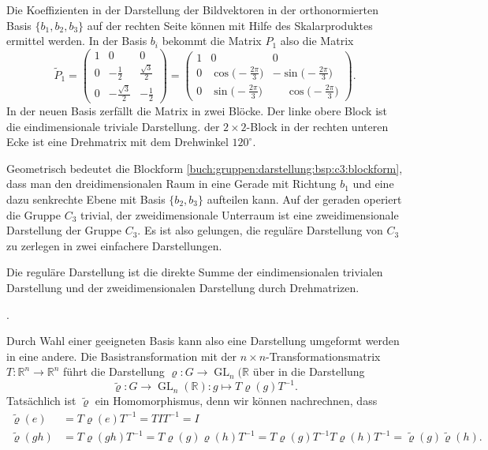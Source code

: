 \begin{beispiel}
Die Koeffizienten in der Darstellung der Bildvektoren in der
orthonormierten Basis $\{b_1,b_2,b_3\}$ auf der rechten Seite
können mit Hilfe des Skalarproduktes ermittel werden.
In der Basis $b_i$ bekommt die Matrix $P_1$ also die Matrix
\begin{equation}
\renewcommand{\arraystretch}{1.2}
\tilde{P}_1
=
\begin{pmatrix}
1&0&0\\
0&-\frac12 & \frac{\!\sqrt{3}}2\\
0&-\frac{\!\sqrt{3}}2&-\frac12
\end{pmatrix}
=
\begin{pmatrix}
1&0&0\\
0&\cos\bigl(-\frac{2\pi}{3}\bigr)& -\sin\bigl(-\frac{2\pi}{3}\bigr) \\
0&\sin\bigl(-\frac{2\pi}{3}\bigr)& \phantom{-}\cos\bigl(-\frac{2\pi}{3}\bigr)
\end{pmatrix}.
\label{buch:gruppen:darstellung:bsp:c3:blockform}
\end{equation}
In der neuen Basis zerfällt die Matrix in zwei Blöcke.
Der linke obere Block ist die eindimensionale triviale Darstellung.
der $2\times 2$-Block in der rechten unteren Ecke ist eine Drehmatrix mit
dem Drehwinkel $120^\circ$.

Geometrisch bedeutet die Blockform
\eqref{buch:gruppen:darstellung:bsp:c3:blockform}, dass man den
dreidimensionalen Raum in eine Gerade mit Richtung $b_1$ und
eine dazu senkrechte Ebene mit Basis $\{b_2,b_3\}$ aufteilen
kann.
Auf der geraden operiert die Gruppe $C_3$ trivial, der zweidimensionale
Unterraum ist eine zweidimensionale Darstellung der Gruppe $C_3$.
Es ist also gelungen, die reguläre Darstellung von $C_3$ zu zerlegen
in zwei einfachere Darstellungen.

Die reguläre Darstellung ist die direkte Summe der eindimensionalen
trivialen Darstellung und der zweidimensionalen Darstellung durch
Drehmatrizen.
\end{beispiel}.

Durch Wahl einer geeigneten Basis kann also eine Darstellung umgeformt
werden in eine andere.
Die Basistransformation mit der $n\times n$-Transformationsmatrix
$T:\mathbb{R}^n\to\mathbb{R}^n$ führt die 
Darstellung $\varrho\colon G\to\operatorname{GL}_n(\mathbb{R}$ über
in die Darstellung
\[
\tilde{\varrho}
\colon
G\to\operatorname{GL}_n(\mathbb{R})
:
g\mapsto T\varrho(g)T^{-1}.
\]
Tatsächlich ist $\tilde{\varrho}$ ein Homomorphismus, denn wir können
nachrechnen, dass
\begin{align*}
\tilde{\varrho}(e)
&=
T\varrho(e)T^{-1}
=
TIT^{-1}
=
I
\\
\tilde{\varrho}(gh)
&=
T\varrho(gh)T^{-1}
=
T\varrho(g)\varrho(h)T^{-1}
=
T\varrho(g)T^{-1}T\varrho(h)T^{-1}
=
\tilde{\varrho}(g)
\tilde{\varrho}(h).
\end{align*}

